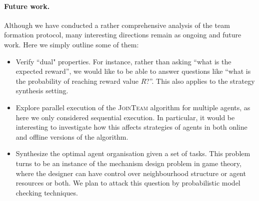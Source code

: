 \documentclass{llncs}
\begin{document}
\paragraph{Future work.} Although we have conducted a rather comprehensive analysis of the team formation protocol, many interesting directions remain as ongoing and future work. Here we simply outline some of them:

\begin{itemize}
\item Verify ``dual" properties. For instance, rather than asking ``what is the expected reward'', we would like to be able to answer questions like ``what is the probability of reaching reward value $R$?''. This also applies to the strategy synthesis setting.

\item Explore parallel execution of the \textsc{JoinTeam} algorithm for multiple agents, as here we only considered sequential execution. %
    In particular, it would be interesting to investigate how this affects strategies of agents in both online and offline versions of the algorithm. %


 \item Synthesize the optimal agent organisation given a set of tasks. %
       This problem turns to be an instance of the mechanism design problem in game theory, where the designer can have control over neighbourhood structure or agent resources or both. We plan to attack this question by probabilistic model checking techniques.
\end{itemize}




\appendix
\end{document}
